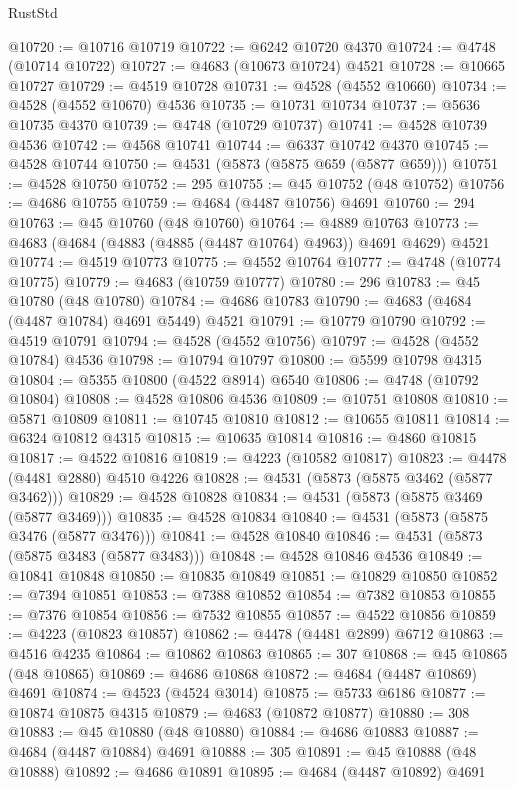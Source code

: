 \begin{lexlean}{RustStd}
\begin{coremodule}
@10720 := @10716 @10719
@10722 := @6242 @10720 @4370
@10724 := @4748 (@10714 @10722)
@10727 := @4683 (@10673 @10724) @4521
@10728 := @10665 @10727
@10729 := @4519 @10728
@10731 := @4528 (@4552 @10660)
@10734 := @4528 (@4552 @10670) @4536
@10735 := @10731 @10734
@10737 := @5636 @10735 @4370
@10739 := @4748 (@10729 @10737)
@10741 := @4528 @10739 @4536
@10742 := @4568 @10741
@10744 := @6337 @10742 @4370
@10745 := @4528 @10744
@10750 := @4531 (@5873 (@5875 @659 (@5877 @659)))
@10751 := @4528 @10750
@10752 := 295
@10755 := @45 @10752 (@48 @10752)
@10756 := @4686 @10755
@10759 := @4684 (@4487 @10756) @4691
@10760 := 294
@10763 := @45 @10760 (@48 @10760)
@10764 := @4889 @10763
@10773 := @4683 (@4684 (@4883 (@4885 (@4487 @10764) @4963)) @4691 @4629) @4521
@10774 := @4519 @10773
@10775 := @4552 @10764
@10777 := @4748 (@10774 @10775)
@10779 := @4683 (@10759 @10777)
@10780 := 296
@10783 := @45 @10780 (@48 @10780)
@10784 := @4686 @10783
@10790 := @4683 (@4684 (@4487 @10784) @4691 @5449) @4521
@10791 := @10779 @10790
@10792 := @4519 @10791
@10794 := @4528 (@4552 @10756)
@10797 := @4528 (@4552 @10784) @4536
@10798 := @10794 @10797
@10800 := @5599 @10798 @4315
@10804 := @5355 @10800 (@4522 @8914) @6540
@10806 := @4748 (@10792 @10804)
@10808 := @4528 @10806 @4536
@10809 := @10751 @10808
@10810 := @5871 @10809
@10811 := @10745 @10810
@10812 := @10655 @10811
@10814 := @6324 @10812 @4315
@10815 := @10635 @10814
@10816 := @4860 @10815
@10817 := @4522 @10816
@10819 := @4223 (@10582 @10817)
@10823 := @4478 (@4481 @2880) @4510 @4226
@10828 := @4531 (@5873 (@5875 @3462 (@5877 @3462)))
@10829 := @4528 @10828
@10834 := @4531 (@5873 (@5875 @3469 (@5877 @3469)))
@10835 := @4528 @10834
@10840 := @4531 (@5873 (@5875 @3476 (@5877 @3476)))
@10841 := @4528 @10840
@10846 := @4531 (@5873 (@5875 @3483 (@5877 @3483)))
@10848 := @4528 @10846 @4536
@10849 := @10841 @10848
@10850 := @10835 @10849
@10851 := @10829 @10850
@10852 := @7394 @10851
@10853 := @7388 @10852
@10854 := @7382 @10853
@10855 := @7376 @10854
@10856 := @7532 @10855
@10857 := @4522 @10856
@10859 := @4223 (@10823 @10857)
@10862 := @4478 (@4481 @2899) @6712
@10863 := @4516 @4235
@10864 := @10862 @10863
@10865 := 307
@10868 := @45 @10865 (@48 @10865)
@10869 := @4686 @10868
@10872 := @4684 (@4487 @10869) @4691
@10874 := @4523 (@4524 @3014)
@10875 := @5733 @6186
@10877 := @10874 @10875 @4315
@10879 := @4683 (@10872 @10877)
@10880 := 308
@10883 := @45 @10880 (@48 @10880)
@10884 := @4686 @10883
@10887 := @4684 (@4487 @10884) @4691
@10888 := 305
@10891 := @45 @10888 (@48 @10888)
@10892 := @4686 @10891
@10895 := @4684 (@4487 @10892) @4691

\end{coremodule}
\end{lexlean}
